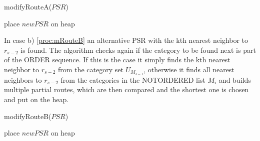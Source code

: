 \begin{procedure}[H]
	\label{proc:mRouteA}
	\caption{modifyRouteA($PSR$)}


	place $newPSR$ on heap\;
\end{procedure}


In case b) \ref{proc:mRouteB} an alternative PSR with the kth nearest neighbor to $r_{s-2}$ is found. The algorithm checks again if the category to be found next is part of the ORDER sequence. If this is the case it simply finds the kth nearest neighbor to $r_{s-2}$ from the category set $U_{M_{s-1}}$, otherwise it finds all nearest neighbors to $r_{s-2}$ from the categories in the NOTORDERED list $M_{i}$ and builds multiple partial routes, which are then compared and the shortest one is chosen and put on the heap. \newline

\begin{procedure}[H]
	\label{proc:mRouteB}
	\caption{modifyRouteB($PSR$)}
	

	place $newPSR$ on heap\;
\end{procedure}

